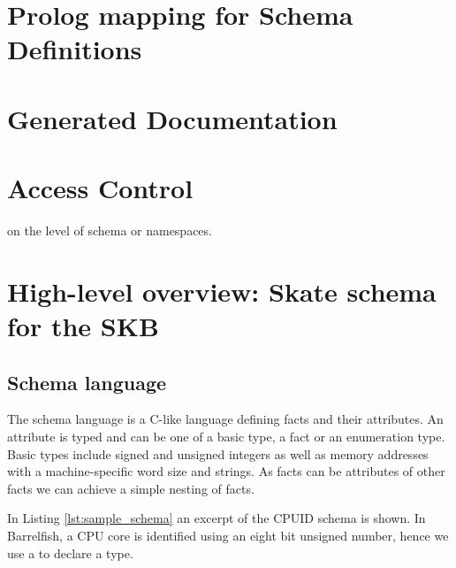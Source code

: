\documentclass[a4paper,11pt,twoside]{report}
\begin{document}
{{%
\chapter{Prolog mapping for Schema Definitions}
\label{chap:prologmapping}




\chapter{Generated Documentation}
\label{chap:documentation}


\chapter{Access Control}
\label{chap:accesscontrol}

on the level of schema or namespaces.

\chapter{High-level overview: Skate schema for the SKB}
\label{chap:overview}



\section{Schema language}

The schema language is a C-like language defining facts and their attributes. An
attribute is typed and can be one of a basic type, a fact or an enumeration
type. Basic types include signed and unsigned integers as well as memory
addresses with a machine-specific word size and strings. As facts can be
attributes of other facts we can achieve a simple nesting of facts.

In Listing \ref{lst:sample_schema} an excerpt of the CPUID schema is shown. In
Barrelfish, a CPU core is identified using an eight bit unsigned number, hence
we use a  to declare a  type.

}}
\end{document}
